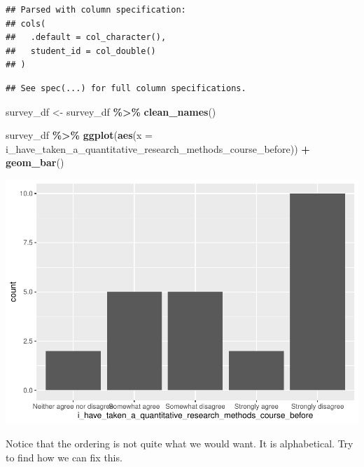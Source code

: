 \documentclass[
]{book}
\newenvironment{Shaded}{\begin{snugshade}}{\end{snugshade}}
\newcommand{\DataTypeTok}[1]{\textcolor[rgb]{0.13,0.29,0.53}{#1}}
\newcommand{\KeywordTok}[1]{\textcolor[rgb]{0.13,0.29,0.53}{\textbf{#1}}}
\newcommand{\NormalTok}[1]{#1}
\newcommand{\OperatorTok}[1]{\textcolor[rgb]{0.81,0.36,0.00}{\textbf{#1}}}
\newcommand{\StringTok}[1]{\textcolor[rgb]{0.31,0.60,0.02}{#1}}
\begin{document}
\begin{verbatim}
## Parsed with column specification:
## cols(
##   .default = col_character(),
##   student_id = col_double()
## )
\end{verbatim}

\begin{verbatim}
## See spec(...) for full column specifications.
\end{verbatim}

\begin{Shaded}
\begin{Highlighting}[]
\NormalTok{survey\_df \textless{}{-}}\StringTok{ }\NormalTok{survey\_df }\OperatorTok{\%\textgreater{}\%}\StringTok{ }\KeywordTok{clean\_names}\NormalTok{()}
\end{Highlighting}
\end{Shaded}

\begin{Shaded}
\begin{Highlighting}[]
\NormalTok{survey\_df }\OperatorTok{\%\textgreater{}\%}\StringTok{ }
\StringTok{  }\KeywordTok{ggplot}\NormalTok{(}\KeywordTok{aes}\NormalTok{(}\DataTypeTok{x =}\NormalTok{ i\_have\_taken\_a\_quantitative\_research\_methods\_course\_before)) }\OperatorTok{+}
\StringTok{  }\KeywordTok{geom\_bar}\NormalTok{()}
\end{Highlighting}
\end{Shaded}

\includegraphics{test_course_notes_files/figure-latex/geom-bar-1.pdf}

Notice that the ordering is not quite what we would want. It is alphabetical. Try to find how we can fix this.
\end{document}
